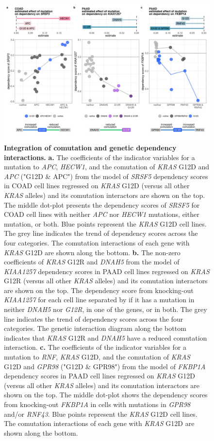 \documentclass[english, 10pt, letterpaper]{article}
\newcommand{\KRAS}{\emph{KRAS}}
\begin{document}
\begin{figure}[h!]
\centering
\includegraphics[width=180mm]{figures/Fig_6.jpeg}
\caption{
    \textbf{Integration of comutation and genetic dependency interactions.}
    \textbf{a.} The coefficients of the indicator variables for a mutation to \emph{APC}, \emph{HECW1}, and the comutation of \KRAS{} G12D and \emph{APC} ("G12D \& APC") from the model of \emph{SRSF5} dependency scores in COAD cell lines regressed on \KRAS{} G12D (versus all other \KRAS{} alleles) and its comutation interactors are shown on the top. The middle dot-plot presents the dependency scores of \emph{SRSF5} for COAD cell lines with neither \emph{APC} nor \emph{HECW1} mutations, either mutation, or both. Blue points represent the \KRAS{} G12D cell lines. The grey line indicates the trend of dependency scores across the four categories. The comutation interactions of each gene with \KRAS{} G12D are shown along the bottom.
    \textbf{b.} The non-zero coefficients of \KRAS{} G12R and \emph{DNAH5} from the model of \emph{KIAA1257} dependency scores in PAAD cell lines regressed on \KRAS{} G12R (versus all other \KRAS{} alleles) and its comutation interactors are shown on the top. The dependency score from knocking-out \emph{KIAA1257} for each cell line separated by if it has a mutation in neither \emph{DNAH5} nor \emph{G12R}, in one of the genes, or in both. The grey line indicates the trend of dependency scores across the four categories. The genetic interaction diagram along the bottom indicates that \KRAS{} G12R and \emph{DNAH5} have a reduced comutation interaction.
    \textbf{c.} The coefficients of the indicator variables for a mutation to \emph{RNF}, \KRAS{} G12D, and the comutation of \KRAS{} G12D and \emph{GPR98} ("G12D \& GPR98") from the model of \emph{FKBP1A} dependency scores in PAAD cell lines regressed on \KRAS{} G12D (versus all other \KRAS{} alleles) and its comutation interactors are shown on the top. The middle dot-plot shows the dependency scores from knocking-out \emph{FKBP1A} in cells with mutations in \emph{GPR98} and/or \emph{RNF43}. Blue points represent the \KRAS{} G12D cell lines.
    The comutation interactions of each gene with \KRAS{} G12D are shown along the bottom.
}
\label{fig:dep-map-comut-adding}
\end{figure}
\newpage
\end{document}
